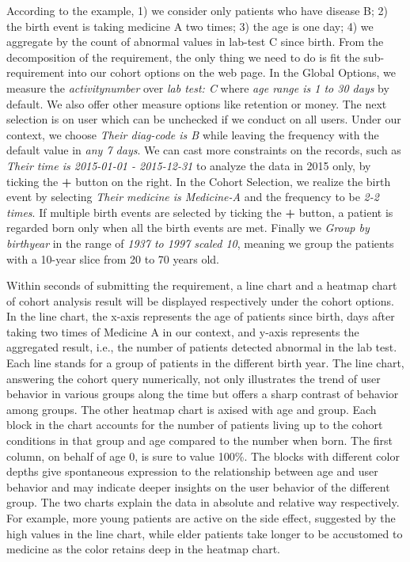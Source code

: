\documentclass[10pt,conference,letterpaper]{IEEEtran}
\begin{document}
According to the example, 1) we consider only patients who have disease B; 2) the birth event is taking medicine A two times; 3) the age is one day; 4) we aggregate by the count of abnormal values in lab-test C since birth. From the decomposition of the requirement, the only thing we need to do is fit the sub-requirement into our cohort options on the web page. In the Global Options, we measure the \emph{activity\textunderscore number} over \emph{lab test: C} where \emph{age range is 1 to 30 days} by default. We also offer other measure options like retention or money. The next selection is on user which can be unchecked if we conduct on all users. Under our context, we choose \emph{Their diag-code is B} while leaving the frequency with the default value in \emph{any 7 days}. We can cast more constraints on the records, such as \emph{Their time is 2015-01-01 - 2015-12-31} to analyze the data in 2015 only, by ticking the \textbf{+} button on the right. In the Cohort Selection, we realize the birth event by selecting \emph{Their medicine is Medicine-A} and the frequency to be \emph{2-2 times}. If multiple birth events are selected by ticking the \textbf{+} button, a patient is regarded born only when all the birth events are met. Finally we \emph{Group by birthyear} in the range of \emph{1937 to 1997 scaled 10}, meaning we group the patients with a 10-year slice from 20 to 70 years old.

Within seconds of submitting the requirement, a line chart and a heatmap chart of cohort analysis result will be displayed respectively under the cohort options. In the line chart, the x-axis represents the age of patients since birth, days after taking two times of Medicine A in our context, and y-axis represents the aggregated result, i.e., the number of patients detected abnormal in the lab test. Each line stands for a group of patients in the different birth year. The line chart, answering the cohort query numerically, not only illustrates the trend of user behavior in various groups along the time but offers a sharp contrast of behavior among groups. The other heatmap chart is axised with age and group. Each block in the chart accounts for the number of patients living up to the cohort conditions in that group and age compared to the number when born. The first column, on behalf of age 0, is sure to value 100\%. The blocks with different color depths give spontaneous expression to the relationship between age and user behavior and may indicate deeper insights on the user behavior of the different group. The two charts explain the data in absolute and relative way respectively. For example, more young patients are active on the side effect, suggested by the high values in the line chart, while elder patients take longer to be accustomed to medicine as the color retains deep in the heatmap chart.
\end{document}

